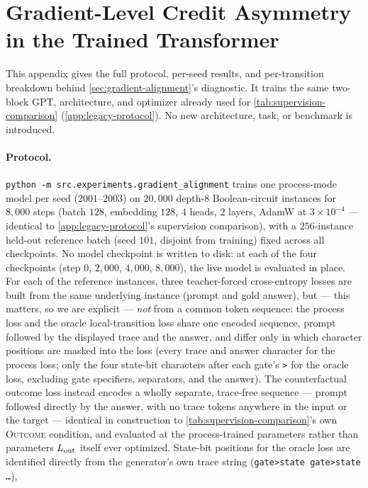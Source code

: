\section{Gradient-Level Credit Asymmetry in the Trained Transformer}
\label{app:gradient-alignment}

This appendix gives the full protocol, per-seed results, and per-transition
breakdown behind \cref{sec:gradient-alignment}'s diagnostic. It trains the
same two-block GPT, architecture, and optimizer already used for
\cref{tab:supervision-comparison} (\cref{app:legacy-protocol}). No new
architecture, task, or benchmark is introduced.

\paragraph{Protocol.} \texttt{python -m src.experiments.gradient\_alignment}
trains one process-mode model per seed ($2001$--$2003$) on $20{,}000$
depth-8 Boolean-circuit instances for $8{,}000$ steps (batch $128$,
embedding $128$, $4$ heads, $2$ layers, AdamW at $3\times10^{-4}$ ---
identical to \cref{app:legacy-protocol}'s supervision comparison), with a
$256$-instance held-out reference batch (seed $101$, disjoint from
training) fixed across all checkpoints. No model checkpoint is written to
disk: at each of the four checkpoints (step $0$, $2{,}000$, $4{,}000$,
$8{,}000$), the live model is evaluated in place. For each of the
reference instances, three teacher-forced cross-entropy losses are built
from the same underlying instance (prompt and gold answer), but --- this
matters, so we are explicit --- \emph{not} from a common token sequence:
the process loss and the oracle local-transition loss share one encoded
sequence, prompt followed by the displayed trace and the answer, and
differ only in which character positions are masked into the loss (every
trace and answer character for the process loss; only the four state-bit
characters after each gate's \texttt{>} for the oracle loss, excluding gate
specifiers, separators, and the answer). The counterfactual outcome loss
instead encodes a wholly separate, trace-free sequence --- prompt followed
directly by the answer, with no trace tokens anywhere in the input or the
target --- identical in construction to \cref{tab:supervision-comparison}'s
own \textsc{Outcome} condition, and evaluated at the process-trained
parameters rather than parameters $L_{\rm out}$ itself ever optimized.
State-bit positions for the oracle loss are identified directly from the
generator's own trace string (\texttt{gate>state gate>state \ldots}),
